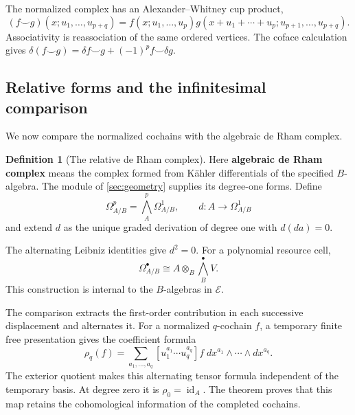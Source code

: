 \documentclass[11pt,a4paper]{article}
\numberwithin{algorithm}{section}
\numberwithin{equation}{section}
\theoremstyle{definition}
\newtheorem{definition}[definition]{Definition}
\theoremstyle{remark}
\theoremstyle{plain}
\newcommand{\E}{\mathcal E}
\newcommand{\id}{\operatorname{id}}
\theoremstyle{definition}
\theoremstyle{plain}
\begin{document}
The normalized complex has an Alexander--Whitney cup product,
\begin{equation}\label{eq:formal-cup}
 (f\smile g)(x;u_1,\ldots,u_{p+q})
 =f(x;u_1,\ldots,u_p)
  g(x+u_1+\cdots+u_p;u_{p+1},\ldots,u_{p+q}).
\end{equation}
Associativity is reassociation of the same ordered vertices.
The coface calculation gives
$\delta(f\smile g)=\delta f\smile g+(-1)^p f\smile\delta g$.


\subsection{Relative forms and the infinitesimal comparison}
\label{sec:derham-comparison}
We now compare the normalized cochains with the algebraic
de Rham complex. 

\begin{definition}[The relative de Rham complex]\label{def:relative-derham}
Here \textbf{algebraic de Rham complex} means the complex formed from
K\"ahler differentials of the specified $B$-algebra. The module of
\cref{sec:geometry} supplies its degree-one forms. Define
\[
 \Omega^p_{A/B}=\bigwedge_A^p\Omega^1_{A/B},
 \qquad d:A\to\Omega^1_{A/B}
\]
and extend $d$ as the unique graded derivation of degree one
with $d(da)=0$.
\end{definition}

  The alternating Leibniz identities give $d^2=0$.
For a polynomial resource cell,
\begin{equation}\label{eq:polynomial-de-rham-forms}
 \Omega^\bullet_{A/B}
 \cong A\otimes_B\bigwedge_B^\bullet V.
\end{equation}
This construction is internal to the $B$-algebras in $\E$.

The comparison extracts the first-order contribution in each
successive displacement and alternates it. For a normalized
$q$-cochain $f$, a temporary finite free presentation gives
the coefficient formula
\begin{equation}\label{eq:formal-hkr-map}
 \rho_q(f)=
 \sum_{a_1,\ldots,a_q}
 [u_1^{a_1}\cdots u_q^{a_q}]f\;
 dx^{a_1}\wedge\cdots\wedge dx^{a_q}.
\end{equation}
The exterior quotient makes this alternating tensor formula
independent of the temporary basis. At degree zero it is
$\rho_0=\id_A$. The theorem proves that this map retains the
cohomological information of the completed cochains.
\end{document}
